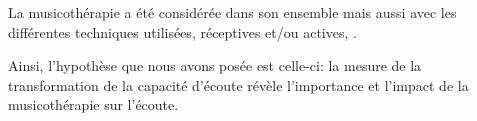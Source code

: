  
 La musicothérapie  a été considérée dans son ensemble mais aussi 
 avec les différentes 
 techniques utilisées, réceptives et/ou actives, .%

 


 

 Ainsi, l'hypothèse que nous avons posée est celle-ci: %
  la  mesure de la  
 transformation de la capacité d'écoute révèle  l'importance et l'impact  de la musicothérapie sur 
 l'écoute.











